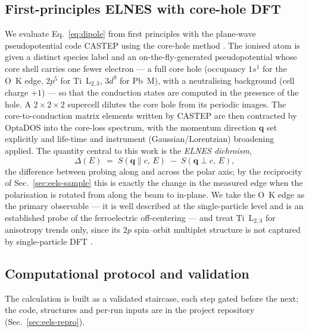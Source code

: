 \subsection{First-principles ELNES with core-hole DFT}
\label{sec:eels-dft}

We evaluate Eq.~\eqref{eq:dipole} from first principles with the plane-wave pseudopotential
code CASTEP \citep{Clark2005} using the core-hole method \citep{Gao2008}. The ionised atom is
given a distinct species label and an on-the-fly-generated pseudopotential whose core shell
carries one fewer electron --- a full core hole (occupancy $1s^1$ for the O~K edge, $2p^5$ for
Ti~L$_{2,3}$, $3d^9$ for Pb~M), with a neutralising background (cell charge $+1$) --- so that
the conduction states are computed in the presence of the hole. A $2\times2\times2$ supercell
dilutes the core hole from its periodic images. The core-to-conduction matrix elements written
by CASTEP are then contracted by OptaDOS \citep{Morris2014,Nicholls2012} into the core-loss
spectrum, with the momentum direction $\hat{\mathbf{q}}$ set explicitly and life-time and
instrument (Gaussian/Lorentzian) broadening applied. The quantity central to this work is the
\emph{ELNES dichroism},
\begin{equation}
  \Delta(E) \;=\; S(\mathbf{q}\!\parallel\! c,\,E)\;-\;S(\mathbf{q}\!\perp\! c,\,E),
  \label{eq:dichroism}
\end{equation}
the difference between probing along and across the polar axis; by the reciprocity of
Sec.~\ref{sec:eels-sample} this is exactly the change in the measured edge when the
polarisation is rotated from along the beam to in-plane. We take the O~K edge as the primary
observable --- it is well described at the single-particle level and is an established probe of
the ferroelectric off-centering \citep{TorresPardo2011,Bugnet2016} --- and treat Ti~L$_{2,3}$
for anisotropy trends only, since its $2p$ spin--orbit multiplet structure is not captured by
single-particle DFT \citep{Mizoguchi2009}.

\subsection{Computational protocol and validation}
\label{sec:eels-protocol}

The calculation is built as a validated staircase, each step gated before the next; the code,
structures and per-run inputs are in the project repository (Sec.~\ref{sec:eels-repro}).

